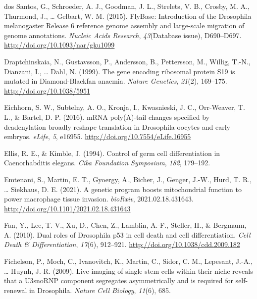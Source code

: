 \documentclass[12pt,oneside]{reedthesis}
\newlength{\cslhangindent}
\newenvironment{cslreferences}%
  {\setlength{\parindent}{0pt}%
  \everypar{\setlength{\hangindent}{\cslhangindent}}\ignorespaces}%
  {\par}
\begin{document}
\begin{cslreferences}
\leavevmode\hypertarget{ref-dossantosFlyBaseIntroductionDrosophila2015}{}%
dos Santos, G., Schroeder, A. J., Goodman, J. L., Strelets, V. B., Crosby, M. A., Thurmond, J., \ldots{} Gelbart, W. M. (2015). FlyBase: Introduction of the Drosophila melanogaster Release 6 reference genome assembly and large-scale migration of genome annotations. \emph{Nucleic Acids Research}, \emph{43}(Database issue), D690--D697. \url{http://doi.org/10.1093/nar/gku1099}

\leavevmode\hypertarget{ref-draptchinskaiaGeneEncodingRibosomal1999}{}%
Draptchinskaia, N., Gustavsson, P., Andersson, B., Pettersson, M., Willig, T.-N., Dianzani, I., \ldots{} Dahl, N. (1999). The gene encoding ribosomal protein S19 is mutated in Diamond-Blackfan anaemia. \emph{Nature Genetics}, \emph{21}(2), 169--175. \url{http://doi.org/10.1038/5951}

\leavevmode\hypertarget{ref-Eichhorn2016n}{}%
Eichhorn, S. W., Subtelny, A. O., Kronja, I., Kwasnieski, J. C., Orr-Weaver, T. L., \& Bartel, D. P. (2016). mRNA poly(A)-tail changes specified by deadenylation broadly reshape translation in Drosophila oocytes and early embryos. \emph{eLife}, \emph{5}, e16955. \url{http://doi.org/10.7554/eLife.16955}

\leavevmode\hypertarget{ref-Ellis1994d}{}%
Ellis, R. E., \& Kimble, J. (1994). Control of germ cell differentiation in Caenorhabditis elegans. \emph{Ciba Foundation Symposium}, \emph{182}, 179--192.

\leavevmode\hypertarget{ref-emtenaniGeneticProgramBoosts2021}{}%
Emtenani, S., Martin, E. T., Gyoergy, A., Bicher, J., Genger, J.-W., Hurd, T. R., \ldots{} Siekhaus, D. E. (2021). A genetic program boosts mitochondrial function to power macrophage tissue invasion. \emph{bioRxiv}, 2021.02.18.431643. \url{http://doi.org/10.1101/2021.02.18.431643}

\leavevmode\hypertarget{ref-fanDualRolesDrosophila2010}{}%
Fan, Y., Lee, T. V., Xu, D., Chen, Z., Lamblin, A.-F., Steller, H., \& Bergmann, A. (2010). Dual roles of Drosophila p53 in cell death and cell differentiation. \emph{Cell Death \& Differentiation}, \emph{17}(6), 912--921. \url{http://doi.org/10.1038/cdd.2009.182}

\leavevmode\hypertarget{ref-Fichelson2009a}{}%
Fichelson, P., Moch, C., Ivanovitch, K., Martin, C., Sidor, C. M., Lepesant, J.-A., \ldots{} Huynh, J.-R. (2009). Live-imaging of single stem cells within their niche reveals that a U3snoRNP component segregates asymmetrically and is required for self-renewal in Drosophila. \emph{Nature Cell Biology}, \emph{11}(6), 685.


\end{cslreferences}
\end{document}
